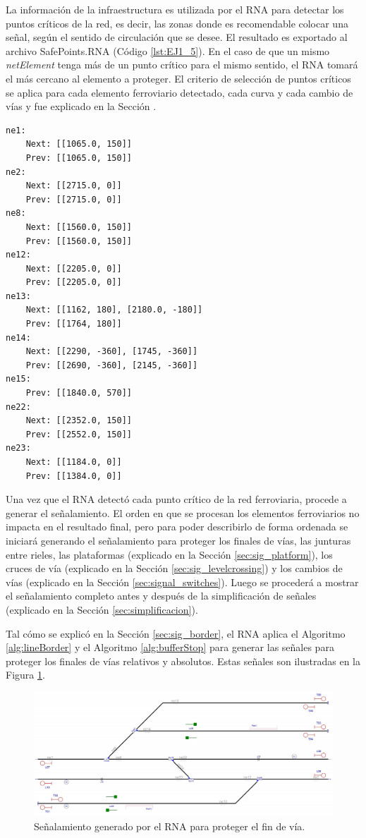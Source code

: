 	La información de la infraestructura es utilizada por el RNA para detectar los puntos críticos de la red, es decir, las zonas donde es recomendable colocar una señal, según el sentido de circulación que se desee. El resultado es exportado al archivo SafePoints.RNA (Código \ref{lst:EJ1_5}). En el caso de que un mismo \textit{netElement} tenga más de un punto crítico para el mismo sentido, el RNA tomará el más cercano al elemento a proteger. El criterio de selección de puntos críticos se aplica para cada elemento ferroviario detectado, cada curva y cada cambio de vías y fue explicado en la Sección \label{sec:generacion}.
	
	\begin{lstlisting}[language = {}, caption = SafePoints.RNA, label = {lst:EJ1_5}]
ne1:
	Next: [[1065.0, 150]]
	Prev: [[1065.0, 150]]
ne2:
	Next: [[2715.0, 0]]
	Prev: [[2715.0, 0]]
ne8:
	Next: [[1560.0, 150]]
	Prev: [[1560.0, 150]]
ne12:
	Next: [[2205.0, 0]]
	Prev: [[2205.0, 0]]
ne13:
	Next: [[1162, 180], [2180.0, -180]]
	Prev: [[1764, 180]]
ne14:
	Next: [[2290, -360], [1745, -360]]
	Prev: [[2690, -360], [2145, -360]]
ne15:
	Prev: [[1840.0, 570]]
ne22:
	Next: [[2352.0, 150]]
	Prev: [[2552.0, 150]]
ne23:
	Next: [[1184.0, 0]]
	Prev: [[1384.0, 0]]
	\end{lstlisting}
	
	Una vez que el RNA detectó cada punto crítico de la red ferroviaria, procede a generar el señalamiento. El orden en que se procesan los elementos ferroviarios no impacta en el resultado final, pero para poder describirlo de forma ordenada se iniciará generando el señalamiento para proteger los finales de vías, las junturas entre rieles, las plataformas (explicado en la Sección \ref{sec:sig_platform}), los cruces de vía (explicado en la Sección \ref{sec:sig_levelcrossing}) y los cambios de vías (explicado en la Sección \ref{sec:signal_switches}). Luego se procederá a mostrar el señalamiento completo antes y después de la simplificación de señales (explicado en la Sección \ref{sec:simplificacion}). 
	
	Tal cómo se explicó en la Sección \ref{sec:sig_border}, el RNA aplica el Algoritmo \ref{alg:lineBorder} y el Algoritmo \ref{alg:bufferStop} para generar las señales para proteger los finales de vías relativos y absolutos. Estas señales son ilustradas en la Figura \ref{fig:EJ1_3}.
	
	\begin{figure}[H]
		\centering
		\includegraphics[width=1\textwidth]{resultados-obtenidos/ejemplo1/images/1_step1.png}
		\centering\caption{Señalamiento generado por el RNA para proteger el fin de vía.}
		\label{fig:EJ1_3}
	\end{figure}
	

